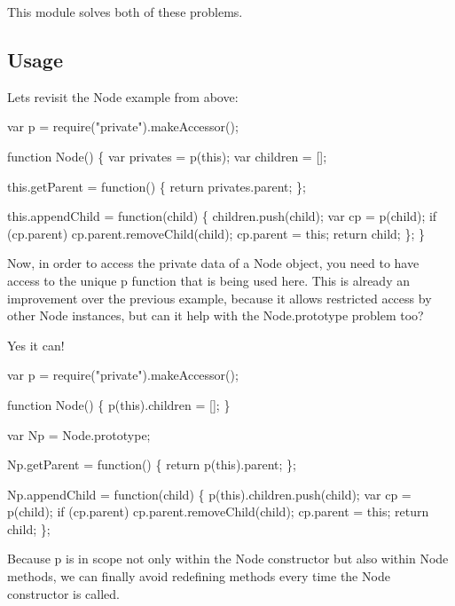 This module solves both of these problems.

\subsection*{Usage }

Let\textquotesingle{}s revisit the {\ttfamily Node} example from above\+: 
\begin{DoxyCode}
var p = require("private").makeAccessor();

function Node() \{
    var privates = p(this);
    var children = [];

    this.getParent = function() \{
        return privates.parent;
    \};

    this.appendChild = function(child) \{
        children.push(child);
        var cp = p(child);
        if (cp.parent)
            cp.parent.removeChild(child);
        cp.parent = this;
        return child;
    \};
\}
\end{DoxyCode}
 Now, in order to access the private data of a {\ttfamily Node} object, you need to have access to the unique {\ttfamily p} function that is being used here. This is already an improvement over the previous example, because it allows restricted access by other {\ttfamily Node} instances, but can it help with the {\ttfamily Node.\+prototype} problem too?

Yes it can! 
\begin{DoxyCode}
var p = require("private").makeAccessor();

function Node() \{
    p(this).children = [];
\}

var Np = Node.prototype;

Np.getParent = function() \{
    return p(this).parent;
\};

Np.appendChild = function(child) \{
    p(this).children.push(child);
    var cp = p(child);
    if (cp.parent)
        cp.parent.removeChild(child);
    cp.parent = this;
    return child;
\};
\end{DoxyCode}
 Because {\ttfamily p} is in scope not only within the {\ttfamily Node} constructor but also within {\ttfamily Node} methods, we can finally avoid redefining methods every time the {\ttfamily Node} constructor is called.

